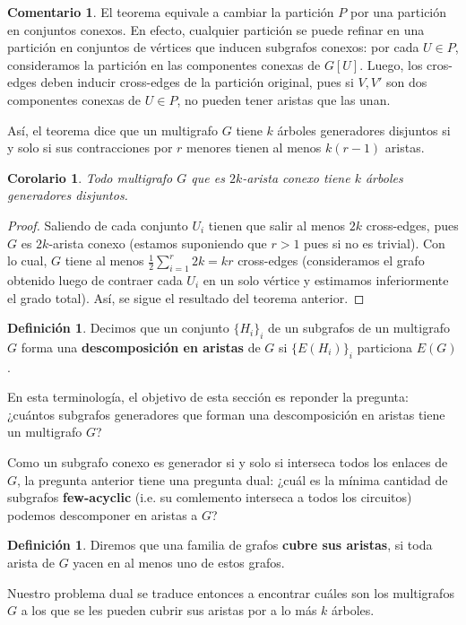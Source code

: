 \documentclass[12pt]{report}
\theoremstyle{plain}
\newtheorem{corollary}[theorem]{Corolario}
\theoremstyle{definition}
\newtheorem{definition}[theorem]{Definición}
\newtheorem{remark}[theorem]{Comentario}
\begin{document}
\begin{remark}
El teorema equivale a cambiar la partición $P$ por una partición en conjuntos conexos. En efecto, cualquier partición se puede refinar en una partición en conjuntos de vértices que inducen subgrafos conexos: por cada $U \in P$, consideramos la partición en las componentes conexas de $G[U]$. Luego, los cros-edges deben inducir cross-edges de la partición original, pues si $V,V'$ son dos componentes conexas de $U \in P$, no pueden tener aristas que las unan.

Así, el teorema dice que un multigrafo $G$ tiene $k$ árboles generadores disjuntos si y solo si sus contracciones por $r$ menores tienen al menos $k(r-1)$ aristas.
\end{remark}

\begin{corollary}
Todo multigrafo $G$ que es $2k$-arista conexo tiene $k$ árboles generadores disjuntos.
\end{corollary}
\begin{proof}
Saliendo de cada conjunto $U_i$ tienen que salir al menos $2k$ cross-edges, pues $G$ es $2k$-arista conexo (estamos suponiendo que $r > 1$ pues si no es trivial). Con lo cual, $G$ tiene al menos $\frac 1 2 \sum_{i = 1}^r 2k = k r$ cross-edges (consideramos el grafo obtenido luego de contraer cada $U_i$ en un solo vértice y estimamos inferiormente el grado total). Así, se sigue el resultado del teorema anterior.
\end{proof}

\begin{definition}
Decimos que un conjunto $\{H_i\}_{i}$ de un subgrafos de un multigrafo $G$ forma una \textbf{descomposición en aristas} de $G$ si $\{E(H_i)\}_i$ particiona $E(G)$.
\end{definition}
En esta terminología, el objetivo de esta sección es reponder la pregunta: ¿cuántos subgrafos generadores que forman una descomposición en aristas tiene un multigrafo $G$?

Como un subgrafo conexo es generador si y solo si interseca todos los enlaces de $G$, la pregunta anterior tiene una pregunta dual: ¿cuál es la mínima cantidad de subgrafos \textbf{few-acyclic} (i.e. su comlemento interseca a todos los circuitos) podemos descomponer en aristas a $G$?

\begin{definition}
Diremos que una familia de grafos \textbf{cubre sus aristas}, si toda arista de $G$ yacen en al menos uno de estos grafos.
\end{definition}
Nuestro problema dual se traduce entonces a encontrar cuáles son los multigrafos $G$ a los que se les pueden cubrir sus aristas por a lo más $k$ árboles.
\end{document}
